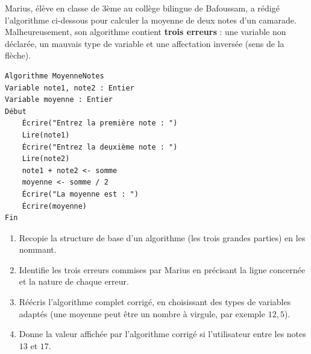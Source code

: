 \documentclass[11pt]{article}
\begin{document}
\begin{exercice}
Marius, élève en classe de 3ème au collège bilingue de Bafoussam, a rédigé l'algorithme ci-dessous pour calculer la moyenne de deux notes d'un camarade. Malheureusement, son algorithme contient \textbf{trois erreurs} : une variable non déclarée, un mauvais type de variable et une affectation inversée (sens de la flèche).

\begin{lstlisting}
Algorithme MoyenneNotes
Variable note1, note2 : Entier
Variable moyenne : Entier
Début
    Écrire("Entrez la première note : ")
    Lire(note1)
    Écrire("Entrez la deuxième note : ")
    Lire(note2)
    note1 + note2 <- somme
    moyenne <- somme / 2
    Écrire("La moyenne est : ")
    Écrire(moyenne)
Fin
\end{lstlisting}

\begin{enumerate}
\item Recopie la structure de base d'un algorithme (les trois grandes parties) en les nommant.
\item Identifie les trois erreurs commises par Marius en précisant la ligne concernée et la nature de chaque erreur.
\item Réécris l'algorithme complet corrigé, en choisissant des types de variables adaptés (une moyenne peut être un nombre à virgule, par exemple $12,5$).
\item Donne la valeur affichée par l'algorithme corrigé si l'utilisateur entre les notes $13$ et $17$.
\end{enumerate}
\end{exercice}
\end{document}
